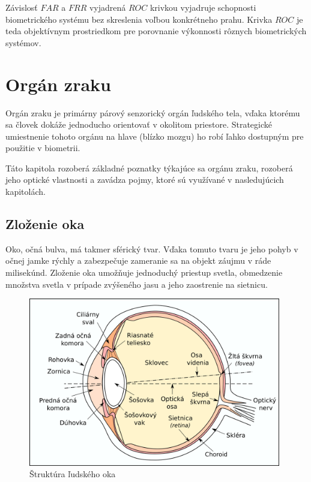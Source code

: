 Závislosť $FAR$ a $FRR$ vyjadrená $ROC$ krivkou vyjadruje schopnosti biometrického systému bez skreslenia voľbou konkrétneho prahu. Krivka $ROC$ je teda objektívnym prostriedkom pre porovnanie výkonnosti rôznych biometrických systémov.

\chapter{Orgán zraku}\label{ch:kap1}
Orgán zraku je primárny párový senzorický orgán ľudského tela, vďaka ktorému sa človek dokáže jednoducho orientovať v okolitom priestore. Strategické umiestnenie tohoto orgánu na hlave (blízko mozgu) ho robí ľahko dostupným pre použitie v biometrii.

Táto kapitola rozoberá základné poznatky týkajúce sa orgánu zraku, rozoberá jeho optické vlastnosti a zavádza pojmy, ktoré sú využívané v nasledujúcich kapitolách.

\section{Zloženie oka}\label{sec:oko}
Oko, očná bulva, má takmer sférický tvar. Vďaka tomuto tvaru je jeho pohyb v očnej jamke rýchly a zabezpečuje zameranie sa na objekt záujmu v ráde milisekúnd\cite{}.
Zloženie oka umožňuje jednoduchý priestup svetla, obmedzenie množstva svetla v prípade zvýšeného jasu a jeho zaostrenie na sietnicu.

\begin{figure}[h]
  \centering
  \includegraphics[width=11cm]{img/Eyesection.png}
  \caption{Štruktúra ľudského oka\cite{retina}}
  \label{fig:retina}
\end{figure}

